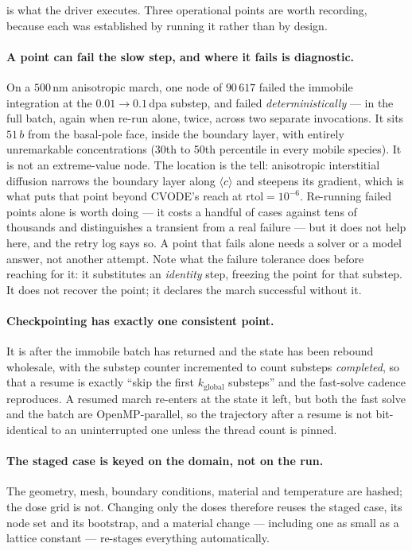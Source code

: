 \documentclass{article}
\begin{document}
 is what the driver executes. Three operational points are worth
recording, because each was established by running it rather than by design.

\paragraph{A point can fail the slow step, and where it fails is diagnostic.} On
a $500\,$nm anisotropic march, one node of $90\,617$ failed the immobile
integration at the $0.01\to0.1\,$dpa substep, and failed
\emph{deterministically} --- in the full batch, again when re-run alone, twice,
across two separate invocations. It sits $51\,b$ from the basal-pole face, inside
the boundary layer, with entirely unremarkable concentrations (30th to 50th
percentile in every mobile species). It is not an extreme-value node. The
location is the tell: anisotropic interstitial diffusion narrows the boundary
layer along $\langle c\rangle$ and steepens its gradient, which is what puts that
point beyond CVODE's reach at $\mathrm{rtol}=10^{-6}$. Re-running failed points
alone is worth doing --- it costs a handful of cases against tens of thousands and
distinguishes a transient from a real failure --- but it does not help here, and
the retry log says so. A point that fails alone needs a solver or a model answer,
not another attempt. Note what the failure tolerance does before reaching for it:
it substitutes an \emph{identity} step, freezing the point for that substep. It
does not recover the point; it declares the march successful without it.

\paragraph{Checkpointing has exactly one consistent point.} It is after the
immobile batch has returned and the state has been rebound wholesale, with the
substep counter incremented to count substeps \emph{completed}, so that a resume
is exactly ``skip the first $k_{\mathrm{global}}$ substeps'' and the fast-solve
cadence reproduces. A resumed march re-enters at the state it left, but both the
fast solve and the batch are OpenMP-parallel, so the trajectory after a resume is
not bit-identical to an uninterrupted one unless the thread count is pinned.

\paragraph{The staged case is keyed on the domain, not on the run.} The geometry,
mesh, boundary conditions, material and temperature are hashed; the dose grid is
not. Changing only the doses therefore reuses the staged case, its node set and
its bootstrap, and a material change --- including one as small as a lattice
constant --- re-stages everything automatically.
\end{document}
